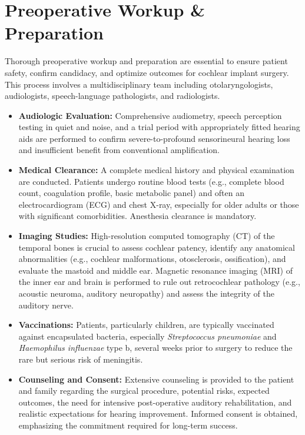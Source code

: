\section*{Preoperative Workup \& Preparation}
Thorough preoperative workup and preparation are essential to ensure patient safety, confirm candidacy, and optimize outcomes for cochlear implant surgery. This process involves a multidisciplinary team including otolaryngologists, audiologists, speech-language pathologists, and radiologists.

\begin{itemize}
  \item \textbf{Audiologic Evaluation:} Comprehensive audiometry, speech perception testing in quiet and noise, and a trial period with appropriately fitted hearing aids are performed to confirm severe-to-profound sensorineural hearing loss and insufficient benefit from conventional amplification.
  \item \textbf{Medical Clearance:} A complete medical history and physical examination are conducted. Patients undergo routine blood tests (e.g., complete blood count, coagulation profile, basic metabolic panel) and often an electrocardiogram (ECG) and chest X-ray, especially for older adults or those with significant comorbidities. Anesthesia clearance is mandatory.
  \item \textbf{Imaging Studies:} High-resolution computed tomography (CT) of the temporal bones is crucial to assess cochlear patency, identify any anatomical abnormalities (e.g., cochlear malformations, otosclerosis, ossification), and evaluate the mastoid and middle ear. Magnetic resonance imaging (MRI) of the inner ear and brain is performed to rule out retrocochlear pathology (e.g., acoustic neuroma, auditory neuropathy) and assess the integrity of the auditory nerve.
  \item \textbf{Vaccinations:} Patients, particularly children, are typically vaccinated against encapsulated bacteria, especially \textit{Streptococcus pneumoniae} and \textit{Haemophilus influenzae} type b, several weeks prior to surgery to reduce the rare but serious risk of meningitis.
  \item \textbf{Counseling and Consent:} Extensive counseling is provided to the patient and family regarding the surgical procedure, potential risks, expected outcomes, the need for intensive post-operative auditory rehabilitation, and realistic expectations for hearing improvement. Informed consent is obtained, emphasizing the commitment required for long-term success.

\end{itemize}
